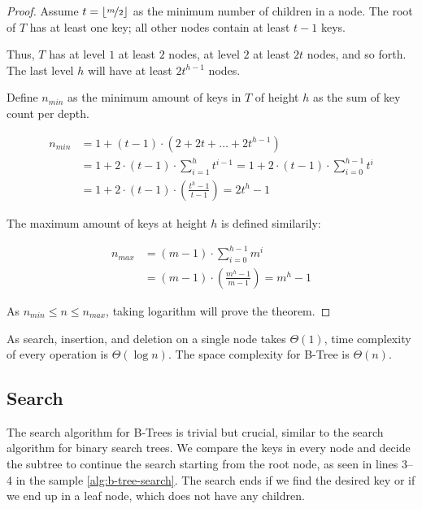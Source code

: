 \begin{proof}
  Assume $t = \lfloor\nicefrac{m}{2}\rfloor$ as the minimum number of children in a node. The root of $T$ has at least one key; all other nodes contain at least $t - 1$ keys.

  Thus, $T$ has at level $1$ at least $2$ nodes, at level $2$ at least $2t$ nodes, and so forth. The last level $h$ will have at least $2t^{h-1}$ nodes.

  Define $n_{min}$ as the minimum amount of keys in $T$ of height $h$ as the sum of key count per depth.

  \begin{equation}
    \begin{split}
      n_{min} & = 1 + (t - 1) \cdot (2 + 2t + \dots + 2t^{h-1}) \\
      &= 1 + 2 \cdot (t - 1) \cdot \sum^{h}_{i = 1}{t^{i-1}} = 1 + 2 \cdot (t - 1) \cdot \sum^{h - 1}_{i = 0}{t^{i}} \\
      &= 1 + 2 \cdot (t - 1) \cdot (\frac{t^h - 1}{t - 1}) = 2t^h - 1
    \end{split}
  \end{equation}

  The maximum amount of keys at height $h$ is defined similarily:

  \begin{equation}
    \begin{split}
      n_{max} & = (m - 1) \cdot \sum^{h - 1}_{i = 0}{m^i} \\
      &= (m - 1) \cdot (\frac{m^h - 1}{m - 1}) = m^h - 1
    \end{split}
  \end{equation}

  As $n_{min} \le n \le n_{max}$, taking logarithm will prove the theorem.
\end{proof}

As search, insertion, and deletion on a single node takes $\Theta{(1)}$, time complexity of every operation is $\Theta{(\log{n})}$. The space complexity for B-Tree is $\Theta{(n)}$.

\subsection{Search}

The search algorithm for B-Trees is trivial but crucial, similar to the search algorithm for binary search trees. We compare the keys in every node and decide the subtree to continue the search starting from the root node, as seen in lines 3--4 in the sample \cref{alg:b-tree-search}. The search ends if we find the desired key or if we end up in a leaf node, which does not have any children.

